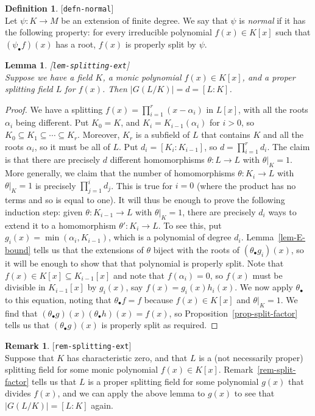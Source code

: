 \documentclass{amsart}
\newcommand{\lbl}[1]{\label{#1}\textup{[\texttt{#1}]}\ \\}
\newcommand{\lbl}{\label}
\newcommand{\al}        {\alpha}
\newcommand{\tht}       {\theta}
\newcommand{\sse}       {\subseteq}
\renewcommand{\:}{\colon}
\newtheorem{lemma}[theorem]{Lemma}
\theoremstyle{definition}
\newtheorem{remark}[theorem]{Remark}
\newtheorem{definition}[theorem]{Definition}
\begin{document}
\begin{definition}\lbl{defn-normal}
 Let $\psi\:K\to M$ be an extension of finite degree.  We say that
 $\psi$ is \emph{normal} if it has the following property: for every
 irreducible polynomial $f(x)\in K[x]$ such that $(\psi_\bullet f)(x)$
 has a root, $f(x)$ is properly split by $\psi$.
\end{definition}

\begin{lemma}\lbl{lem-splitting-ext}
 Suppose we have a field $K$, a monic polynomial $f(x)\in K[x]$, and a
 proper splitting field $L$ for $f(x)$.  Then $|G(L/K)|=d=[L:K]$.
\end{lemma}
\begin{proof}
 We have a splitting $f(x)=\prod_{i=1}^r(x-\al_i)$ in $L[x]$, with all
 the roots $\al_i$ being different.  Put $K_0=K$, and
 $K_i=K_{i-1}(\al_i)$ for $i>0$, so $K_0\sse K_1\sse\dotsb\sse K_r$.
 Moreover, $K_r$ is a subfield of $L$ that contains $K$ and all the
 roots $\al_i$, so it must be all of $L$.  Put $d_i=[K_i:K_{i-1}]$, so
 $d=\prod_{i=1}^rd_i$.  The claim is that there are precisely $d$
 different homomorphisms $\tht\:L\to L$ with $\tht|_K=1$.  More
 generally, we claim that the number of homomorphisms $\tht\:K_i\to L$
 with $\tht|_K=1$ is precisely $\prod_{j=1}^id_j$.  This is true for
 $i=0$ (where the product has no terms and so is equal to one).  It
 will thus be enough to prove the following induction step: given
 $\tht\:K_{i-1}\to L$ with $\tht|_K=1$, there are precisely $d_i$ ways
 to extend it to a homomorphism $\tht'\:K_i\to L$.  To see this, put
 $g_i(x)=\min(\al_i,K_{i-1})$, which is a polynomial of degree $d_i$.
 Lemma~\ref{lem-E-bound} tells us that the extensions of $\tht$ biject
 with the roots of $(\tht_\bullet g_i)(x)$, so it will be enough to
 show that that polynomial is properly split.  Note that $f(x)\in
 K[x]\sse K_{i-1}[x]$ and note that $f(\al_i)=0$, so $f(x)$ must be
 divisible in $K_{i-1}[x]$ by $g_i(x)$, say $f(x)=g_i(x)h_i(x)$.  We
 now apply $\tht_\bullet$ to this equation, noting that $\tht_\bullet
 f=f$ because $f(x)\in K[x]$ and $\tht|_K=1$.  We find that
 $(\tht_\bullet g)(x)(\tht_\bullet h)(x)=f(x)$, so
 Proposition~\ref{prop-split-factor} tells us that
 $(\tht_\bullet g)(x)$ is properly split as required.
\end{proof}

\begin{remark}\lbl{rem-splitting-ext}
 Suppose that $K$ has characteristic zero, and that $L$ is a (not
 necessarily proper) splitting field for some monic polynomial
 $f(x)\in K[x]$.  Remark~\ref{rem-split-factor} tells us that $L$ is a
 proper splitting field for some polynomial $g(x)$ that divides
 $f(x)$, and we can apply the above lemma to $g(x)$ to see that
 $|G(L/K)|=[L:K]$ again.
\end{remark}
\end{document}
